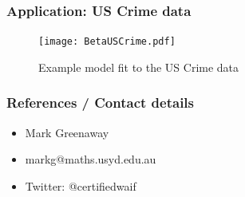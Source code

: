 \documentclass[notes=only]{beamer}
\begin{document}
\begin{frame}
	\frametitle{Application: US Crime data}
	\begin{figure}
		\caption{Example model fit to the US Crime data}
		\texttt{[image: BetaUSCrime.pdf]}
	\end{figure}
\end{frame}


\begin{frame}
	\frametitle{References / Contact details}
	\begin{itemize}
		\item Mark Greenaway
		\item markg@maths.usyd.edu.au
		\item Twitter: @certifiedwaif	
	\end{itemize}

	\small
	
	
\end{frame}

\end{document}
